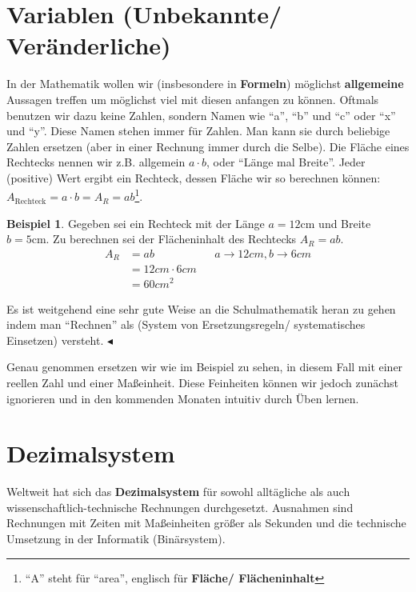\documentclass[a4paper]{book}%
\newcommand{\topicend}{
      $\blacktriangleleft$
}
\theoremstyle{definition}
\newtheorem{beispiel}{Beispiel}
\begin{document}
\section{Variablen (Unbekannte/ Veränderliche)}

In der Mathematik wollen wir (insbesondere in \textbf{Formeln}) möglichst \textbf{allgemeine} Aussagen treffen um möglichst viel mit diesen anfangen zu können. Oftmals benutzen wir dazu keine Zahlen, sondern Namen wie \enquote{a}, \enquote{b} und \enquote{c} oder \enquote{x} und \enquote{y}. Diese Namen stehen immer für Zahlen. Man kann sie durch beliebige Zahlen ersetzen (aber in einer Rechnung immer durch die Selbe). Die Fläche eines Rechtecks nennen wir z.B. allgemein $a \cdot b$, oder \enquote{Länge mal Breite}. Jeder (positive) Wert ergibt ein Rechteck, dessen Fläche wir so berechnen können: $A_{\text{Rechteck}} = a \cdot b = A_R = a b$\footnote{\enquote{A} steht für \enquote{area}, englisch für \textbf{Fläche/ Flächeninhalt}}.

\begin{beispiel}
    Gegeben sei ein Rechteck mit der Länge $a = 12 \text{cm}$ und Breite $b = 5 \text{cm}$. Zu berechnen sei der Flächeninhalt des Rechtecks $A_R = a b$.
    \begin{align}
      A_R & =  a b && a \rightarrow 12 cm, b \rightarrow 6 cm\\
       & =  12 cm \cdot 6 cm &&\\
       & =  60 cm^2 &&
    \end{align}

    Es ist weitgehend eine sehr gute Weise an die Schulmathematik heran zu gehen indem man \enquote{Rechnen} als  (System von Ersetzungsregeln/ systematisches Einsetzen) versteht.\topicend
\end{beispiel}

Genau genommen ersetzen wir wie im Beispiel zu sehen, in diesem Fall mit einer reellen Zahl und einer Maßeinheit. Diese Feinheiten können wir jedoch zunächst ignorieren und in den kommenden Monaten intuitiv durch Üben lernen.


\section{Dezimalsystem}\label{Dezimalsystem}

Weltweit hat sich das \textbf{Dezimalsystem} für sowohl alltägliche als auch wis\-sen\-schaft\-lich-\-tech\-nische Rechnungen durchgesetzt. Ausnahmen sind Rechnungen mit Zeiten mit Maßeinheiten größer als Sekunden und die technische Umsetzung in der Informatik (Binärsystem).
\end{document}

